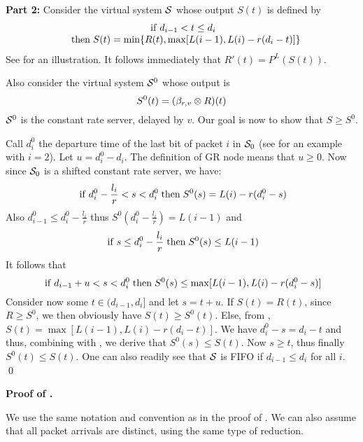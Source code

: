 \textbf{Part 2: } Consider the virtual system $\mathcal S$ whose output
$S(t)$ is defined by
\begin{equation}\mylabel{eq-pr-defS}
  \begin{array}{c}
   \mif d_{i-1} < t \leq d_i\\
    \; \; \mthen S(t)=\min\{R(t), \max[L(i-1), L(i) -r(d_i-t)]\}
  \end{array}
\end{equation}
See  for an illustration. It follows
immediately that $R'(t)=P^L(S(t))$.

Also consider the virtual system $\mathcal S^0$ whose output is
 $$S^0(t) = (\beta_{r,v}\otimes R)(t)$$
$\mathcal S^0$ is the constant
 rate server, delayed by $v$. Our goal is now to show that
 $S \geq S^0$.

Call $d^0_i$ the departure time of the last bit of packet $i$ in
$\mathcal S_0$ (see  for an example with $i=2$). Let
$u=d^0_i - d_i$. The definition of GR node means that $u \geq 0$.
Now since $\mathcal S_0$ is a shifted constant rate server, we have:
 $$\mathrm{\; if \; } d^0_i-\frac{l_i}{r} <s < d^0_i
 \mathrm{\; then \; }
 S^0(s) = L(i) - r(d^0_i-s)
 $$
Also $d^0_{i-1} \leq d^0_i-\frac{l_i}{r}$ thus
$S^0(d^0_i-\frac{l_i}{r}) = L(i-1)$ and
 $$\mathrm{\; if \; } s \leq  d^0_i -\frac{l_i}{r}
 \mathrm{\; then \; } S^0(s) \leq L(i-1)
 $$
It follows that
\begin{equation}\mylabel{eq-gr-prv2}
\mif d_{i-1}+u <s < d^0_i
 \mthen
 S^0(s) \leq \max[L(i-1), L(i) -r(d^0_i-s)]
\end{equation}
Consider now some $t \in (d_{i-1},d_i]$ and let $s=t+u$. If
$S(t)=R(t)$, since $R \geq  S^0$, we then obviously have $S(t)
\geq S^0(t)$. Else, from , $S(t)=\max[L(i-1), L(i)
-r(d_i-t)]$. We have $d^0_i-s=d_i-t$ and thus, combining with
, we derive that $S^0(s) \leq S(t)$. Now $s \geq
t$, thus finally $S^0(t) \leq S(t)$. One can also readily see that
$\mathcal S$ is FIFO if $d_{i-1}\leq d_i$ for all $i$. \qed
\begin{figure}[!htbp]
\end{figure}


\textbf{Proof of . }

We use the same notation and convention as in the proof of
. We can also assume that all packet arrivals
are distinct, using the same type of reduction.

